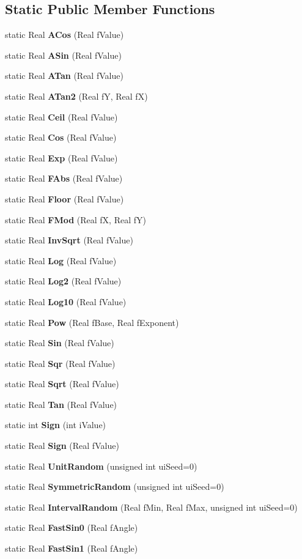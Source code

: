 \subsection*{Static Public Member Functions}
\begin{CompactItemize}
\item 
static Real {\bf ACos} (Real f\-Value)
\item 
static Real {\bf ASin} (Real f\-Value)
\item 
static Real {\bf ATan} (Real f\-Value)
\item 
static Real {\bf ATan2} (Real f\-Y, Real f\-X)
\item 
static Real {\bf Ceil} (Real f\-Value)
\item 
static Real {\bf Cos} (Real f\-Value)
\item 
static Real {\bf Exp} (Real f\-Value)
\item 
static Real {\bf FAbs} (Real f\-Value)
\item 
static Real {\bf Floor} (Real f\-Value)
\item 
static Real {\bf FMod} (Real f\-X, Real f\-Y)
\item 
static Real {\bf Inv\-Sqrt} (Real f\-Value)
\item 
static Real {\bf Log} (Real f\-Value)
\item 
static Real {\bf Log2} (Real f\-Value)
\item 
static Real {\bf Log10} (Real f\-Value)
\item 
static Real {\bf Pow} (Real f\-Base, Real f\-Exponent)
\item 
static Real {\bf Sin} (Real f\-Value)
\item 
static Real {\bf Sqr} (Real f\-Value)
\item 
static Real {\bf Sqrt} (Real f\-Value)
\item 
static Real {\bf Tan} (Real f\-Value)
\item 
static int {\bf Sign} (int i\-Value)
\item 
static Real {\bf Sign} (Real f\-Value)
\item 
static Real {\bf Unit\-Random} (unsigned int ui\-Seed=0)
\item 
static Real {\bf Symmetric\-Random} (unsigned int ui\-Seed=0)
\item 
static Real {\bf Interval\-Random} (Real f\-Min, Real f\-Max, unsigned int ui\-Seed=0)
\item 
static Real {\bf Fast\-Sin0} (Real f\-Angle)
\item 
static Real {\bf Fast\-Sin1} (Real f\-Angle)

\end{CompactItemize}
